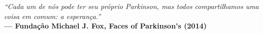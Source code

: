 
\renewcommand{\epigraphname}{EPÍGRAFE}

\begin{epigrafe}

    \textit{``Cada um de nós pode ter seu próprio Parkinson, mas todos compartilhamos uma coisa em comum: a esperança.''}\\
    \textbf{— Fundação Michael J. Fox, Faces of Parkinson's (2014)}

\end{epigrafe}

